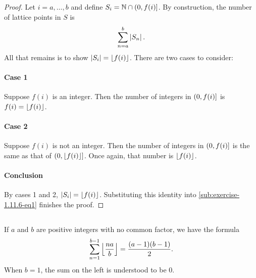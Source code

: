 \documentclass{report}
\begin{document}
\begin{proof}

  Let $i = a, \ldots, b$ and define $S_i = \mathbb{N} \cap \left(0, f(i)\right]$.
  By construction, the number of lattice points in $S$ is
    \begin{equation}
      \label{sub:exercise-1.11.6-eq1}
      \sum_{n = a}^b \left|S_n\right|.
    \end{equation}
  All that remains is to show $\left|S_i\right| = \left\lfloor f(i)\right\rfloor$.
  There are two cases to consider:

  \paragraph{Case 1}%

    Suppose $f(i)$ is an integer.
    Then the number of integers in $\left(0, f(i)\right]$ is $f(i) = \left\lfloor f(i)\right\rfloor$.

  \paragraph{Case 2}%

    Suppose $f(i)$ is not an integer.
    Then the number of integers in $\left(0, f(i)\right]$ is the same as that of
      $\left(0, \left\lfloor f(i)\right\rfloor\right]$.
    Once again, that number is $\left\lfloor f(i)\right\rfloor$.

  \paragraph{Conclusion}%

    By cases 1 and 2, $\left|S_i\right| = \left\lfloor f(i)\right\rfloor$.
    Substituting this identity into \eqref{sub:exercise-1.11.6-eq1} finishes the
      proof.

\end{proof}

\subsection{}%
\label{sub:exercise-1.11.7}

If $a$ and $b$ are positive integers with no common factor, we have the formula
  $$\sum_{n=1}^{b-1} \left\lfloor\frac{na}{b}\right\rfloor = \frac{(a - 1)(b - 1)}{2}.$$
When $b = 1$, the sum on the left is understood to be $0$.


\subsubsection{}%
\label{ssub:exercise-1.11.7a}
\end{document}

